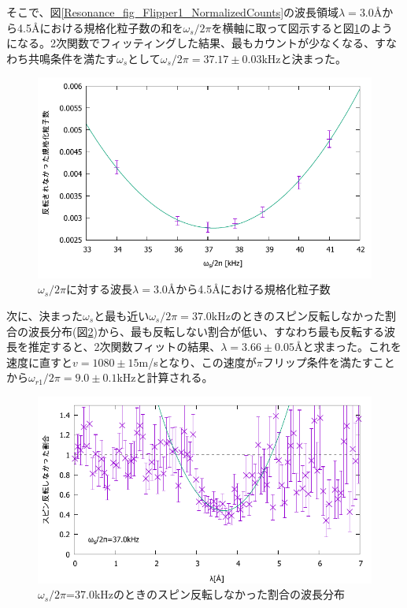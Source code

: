 そこで、図\ref{Resonance_fig_Flipper1_NormalizedCounts}の波長領域$\lambda=$3.0{\AA}から4.5{\AA}における規格化粒子数の和を$\omega_s/2\pi$を横軸に取って図示すると図\ref{Resonance_fig_Flipper1_Freq}のようになる。2次関数でフィッティングした結果、最もカウントが少なくなる、すなわち共鳴条件を満たす$\omega_s$として$\omega_s/2\pi=37.17\pm0.03$kHzと決まった。

\begin{figure}[h]
\centering
\includegraphics[width=12cm]{resonance/analysis/Flipper1_Freq_30-45r.pdf}
\caption{$\omega_s/2\pi$に対する波長$\lambda=$3.0{\AA}から4.5{\AA}における規格化粒子数}\label{Resonance_fig_Flipper1_Freq}
\end{figure}

次に、決まった$\omega_s$と最も近い$\omega_s/2\pi=37.0$kHzのときのスピン反転しなかった割合の波長分布(図\ref{Resonance_fig_Flipper1_CountsRate_370fit})から、最も反転しない割合が低い、すなわち最も反転する波長を推定すると、2次関数フィットの結果、$\lambda=3.66\pm0.05${\AA}と求まった。これを速度に直すと$v=1080\pm15$m/sとなり、この速度が$\pi$フリップ条件を満たすことから$\omega_{r1}/2\pi=9.0\pm0.1$kHzと計算される。
\begin{figure}[h]
\centering
\includegraphics[width=12cm]{resonance/analysis/Flipper1_CountsRate_370kHz_fit.pdf}
\caption{$\omega_s/2\pi$=37.0kHzのときのスピン反転しなかった割合の波長分布}\label{Resonance_fig_Flipper1_CountsRate_370fit}
\end{figure}

